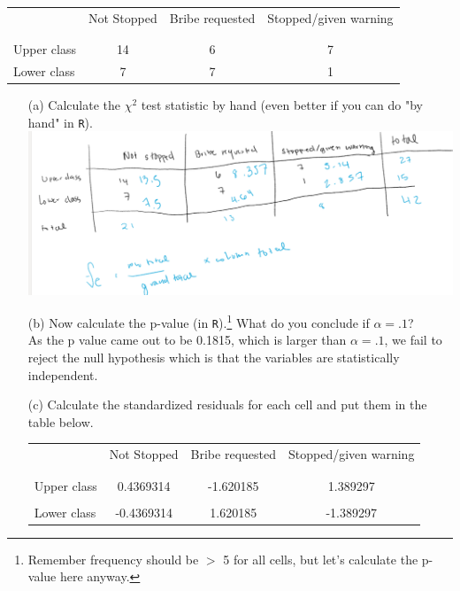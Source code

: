 \documentclass[12pt,letterpaper]{article}
\begin{document}
\newpage
\begin{table}[h!]
	\centering
	\begin{tabular}{l | c c c }
		& Not Stopped & Bribe requested & Stopped/given warning \\
		\\[-1.8ex] 
		\hline \\[-1.8ex]
		Upper class & 14 & 6 & 7 \\
		Lower class & 7 & 7 & 1 \\
		\hline
	\end{tabular}
\end{table}

\begin{enumerate}
	
	\item [(a)]
	Calculate the $\chi^2$ test statistic by hand (even better if you can do "by hand" in \texttt{R}).\\

	
	\includegraphics{Q1}
	
	
	\item [(b)]
	Now calculate the p-value (in \texttt{R}).\footnote{Remember frequency should be $>$ 5 for all cells, but let's calculate the p-value here anyway.}  What do you conclude if $\alpha = .1$?\\
	
	
	
	As the p value came out to be 0.1815, which is larger than $\alpha = .1$, we fail to reject the null hypothesis which is that the variables are statistically independent. 
	
	\newpage
	\item [(c)] Calculate the standardized residuals for each cell and put them in the table below.
	\vspace{1cm}
	
	\begin{table}[h]
		\centering
		\begin{tabular}{l | c c c }
			& Not Stopped & Bribe requested & Stopped/given warning \\
			\\[-1.8ex] 
			\hline \\[-1.8ex]
			Upper class  & 0.4369314 & -1.620185 & 1.389297 \\
			\\
			Lower class & -0.4369314 & 1.620185  & -1.389297\\
			

\end{tabular}
\end{table}
\end{enumerate}
\end{document}
